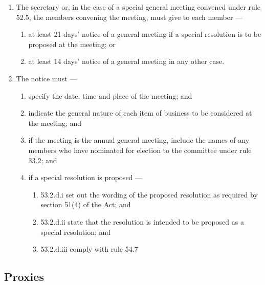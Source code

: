 \documentclass[../constitution.tex]{subfiles}
\begin{document}
\begin{enumerate}

\item The secretary or, in the case of a special general meeting convened under rule 52.5, the members convening the meeting, must give to each member ---

  \begin{enumerate}
  
  \item at least 21 days' notice of a general meeting if a special resolution is to be proposed at the meeting; or
  \item at least 14 days' notice of a general meeting in any other case.
  \end{enumerate}
\item The notice must ---

  \begin{enumerate}
  
  \item specify the date, time and place of the meeting; and
  \item indicate the general nature of each item of business to be considered at the meeting; and
  \item if the meeting is the annual general meeting, include the names of any members who have nominated for election to the committee under rule 33.2; and
  \item if a special resolution is proposed ---

    \begin{enumerate}
    
    \item 53.2.d.i set out the wording of the proposed resolution as required by section 51(4) of the Act; and
    \item 53.2.d.ii state that the resolution is intended to be proposed as a special resolution; and
    \item 53.2.d.iii comply with rule 54.7
    \end{enumerate}
  \end{enumerate}
\end{enumerate}

\hypertarget{proxies}{%
\subsection{Proxies}\label{proxies}}
\end{document}
